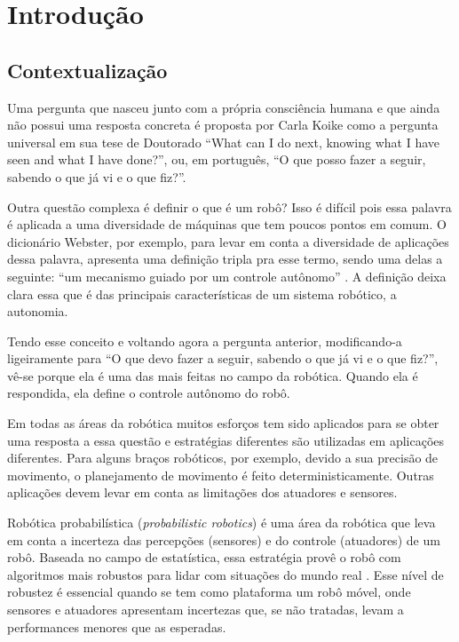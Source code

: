  


\chapter{Introdução} \label{Chap:Intro}


\section{Contextualização}

Uma pergunta que nasceu junto com a própria consciência humana e que ainda não possui uma resposta concreta é proposta por Carla Koike como a pergunta universal em sua tese de Doutorado \cite{Koike:2005} ``What can I do next, knowing what I have seen and what I have done?'', ou, em português, ``O que posso fazer a seguir, sabendo o que já vi e o que fiz?''.

Outra questão complexa é definir o que é um robô? Isso é difícil pois essa palavra é aplicada a uma diversidade de máquinas que tem poucos pontos em comum. O dicionário Webster, por exemplo, para levar em conta a diversidade de aplicações dessa palavra, apresenta uma definição tripla pra esse termo, sendo uma delas a seguinte: “um mecanismo guiado por um controle autônomo” \cite{Fievet_2002}. A definição deixa clara essa que é das principais características de um sistema robótico, a autonomia.

Tendo esse conceito e voltando agora a pergunta anterior, modificando-a ligeiramente para “O que devo fazer a seguir, sabendo o que já vi e o que fiz?”, vê-se porque ela é uma das mais feitas no campo da robótica. Quando ela é respondida, ela define o controle autônomo do robô.

Em todas as áreas da robótica muitos esforços tem sido aplicados para se obter uma resposta a essa questão e estratégias diferentes são utilizadas em aplicações diferentes. Para alguns braços robóticos, por exemplo, devido a sua precisão de movimento, o planejamento de movimento é feito deterministicamente. Outras aplicações devem levar em conta as limitações dos atuadores e sensores.

Robótica probabilística (\textit{probabilistic robotics}) é uma área da robótica que leva em conta a incerteza das percepções (sensores) e do controle (atuadores) de um robô. Baseada no campo de estatística, essa estratégia provê o robô com algoritmos mais robustos para lidar com situações do mundo real \cite{Thrun:2005:PR:1121596}. Esse nível de robustez é essencial quando se tem como plataforma um robô móvel, onde sensores e atuadores apresentam incertezas que, se não tratadas, levam a performances menores que as esperadas.

